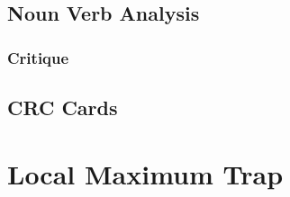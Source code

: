 \subsection{Noun Verb Analysis}
\subsubsection{Critique}
\subsection{CRC Cards}

\section{Local Maximum Trap}


